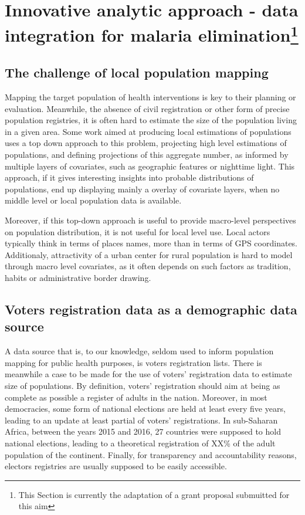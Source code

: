 \section[Innovative analytic approach - data integration for malaria elimination]{Innovative analytic approach - data integration for malaria elimination\footnote{This Section is currently the adaptation of a grant proposal submuitted for this aim}}

\subsection{The challenge of local population mapping}

Mapping the target population of health interventions is key to their planning or evaluation. Meanwhile, the absence of civil registration or other form of precise population registries, it is often hard to estimate the size of the population living in a given area. Some work aimed at producing local estimations of populations uses a top down approach to this problem, projecting high level estimations of populations, and defining projections of this aggregate number, as informed by multiple layers of covariates, such as geographic features or nighttime light. This approach, if it gives interesting insights into probable distributions of populations, end up displaying mainly a overlay of covariate layers, when no middle level or local population data is available.

Moreover, if this top-down approach is useful to provide macro-level perspectives on population distribution, it is not useful for local level use. Local actors typically think in terms of places names, more than in terms of GPS coordinates. Additionaly, attractivity of a urban center for rural population is hard to model through macro level covariates, as it often depends on such factors as tradition, habits or administrative border drawing.

\subsection{Voters registration data as a demographic data source}

A data source that is, to our knowledge, seldom used to inform population mapping for public health purposes, is voters registration lists. There is meanwhile a case to be made for the use of voters' registration data to estimate size of populations. By definition, voters' registration should aim at being as complete as possible a register of adults in the nation. Moreover, in most democracies, some form of national elections are held at least  every five years, leading to an update at least partial of voters' registrations. In sub-Saharan Africa, between the years 2015 and 2016, 27 countries were supposed to hold national elections, leading to a theoretical registration of XX\% of the adult population of the continent. Finally, for transparency and accountability reasons, electors registries are usually supposed to be easily accessible.


